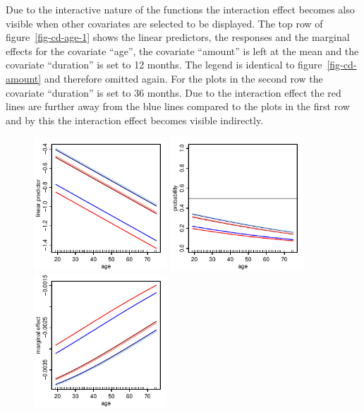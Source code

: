 \documentclass[nojss]{jss}
\newcommand{\quotes}[1]{``#1''}
\begin{document}
Due to the interactive nature of the functions the interaction effect becomes also visible when other covariates are selected to be displayed. The top row of  figure~\ref{fig-cd-age-1} shows the linear predictors, the responses and the marginal effects for the covariate \quotes{age}, the covariate  \quotes{amount} is left at the mean and the covariate \quotes{duration} is set to 12 months.  The legend is identical to figure~\ref{fig-cd-amount} and therefore omitted again. For the plots in the second row the covariate \quotes{duration} is set to 36 months. Due to the interaction effect the red lines are further away from the blue lines compared to the plots in the first row and by this the interaction effect becomes visible indirectly.

\begin{figure}[H]
\centering
\includegraphics[width=5cm]{cd-age-link-1-001} \includegraphics[width=5cm]{cd-age-resp-1-001} \includegraphics[width=5cm]{cd-age-marg-1-001}


\end{figure}
\end{document}
